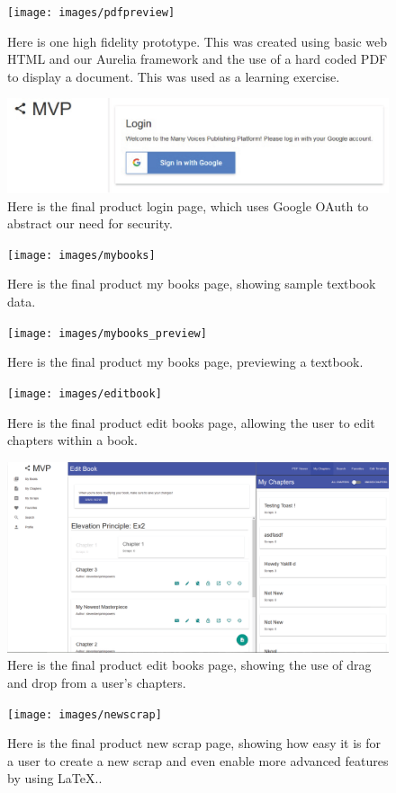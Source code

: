 \documentclass[onecolumn, draftclsnofoot,10pt, compsoc]{IEEEtran}
\begin{document}
	\begin{figure}[ht!]
		\centering
		\texttt{[image: images/pdfpreview]}
		\caption{Here is one high fidelity prototype. This was created using basic web HTML and our Aurelia framework and the use of a hard coded PDF to display a document. This was used as a learning exercise.}
	\end{figure}
	
	\begin{figure}[ht!]
		\centering
		\includegraphics[width=\textwidth]{images/login_page}
		\caption{Here is the final product login page, which uses Google OAuth to abstract our need for security.}
	\end{figure}
	
	\begin{figure}[ht!]
		\centering
		\texttt{[image: images/mybooks]}
		\caption{Here is the final product my books page, showing sample textbook data.}
	\end{figure}
	
	\begin{figure}[ht!]
		\centering
		\texttt{[image: images/mybooks\_preview]}
		\caption{Here is the final product my books page, previewing a textbook.}
	\end{figure}
	
	\begin{figure}[ht!]
		\centering
		\texttt{[image: images/editbook]}
		\caption{Here is the final product edit books page, allowing the user to edit chapters within a book.}
	\end{figure}
	
	\begin{figure}[ht!]
		\centering
		\includegraphics[width=\textwidth]{images/editbook_drag}
		\caption{Here is the final product edit books page, showing the use of drag and drop from a user's chapters.}
	\end{figure}
	
	\begin{figure}[ht!]
		\centering
		\texttt{[image: images/newscrap]}
		\caption{Here is the final product new scrap page, showing how easy it is for a user to create a new scrap and even enable more advanced features by using LaTeX..}
	\end{figure}
\end{document}
